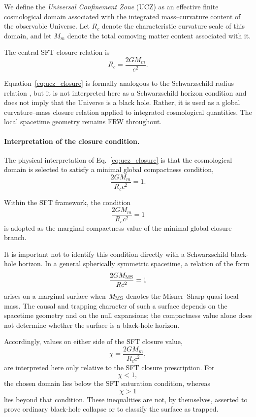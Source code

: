 \documentclass[12pt]{article}
\begin{document}
We define the \emph{Universal Confinement Zone} (UCZ) as an effective
finite cosmological domain associated with the integrated mass--curvature
content of the observable Universe. Let $R_c$ denote the characteristic
curvature scale of this domain, and let $M_m$ denote the total comoving
matter content associated with it.

The central SFT closure relation is
\begin{equation}
\boxed{
R_c=\frac{2GM_m}{c^2}.
}
\label{eq:ucz_closure}
\end{equation}

Equation~\eqref{eq:ucz_closure} is formally analogous to the
Schwarzschild radius relation
\cite{Schwarzschild1916,Carroll2001},
but it is not interpreted here as a Schwarzschild horizon condition and
does not imply that the Universe is a black hole.
Rather, it is used as a global curvature--mass closure relation applied
to integrated cosmological quantities.
The local spacetime geometry remains FRW throughout.

\paragraph{Interpretation of the closure condition.}

The physical interpretation of
Eq.~\eqref{eq:ucz_closure}
is that the cosmological domain is selected to satisfy a minimal global
compactness condition,
\begin{equation}
\frac{2GM_m}{R_c c^2}=1.
\end{equation}

Within the SFT framework, the condition
\[
\frac{2GM_m}{R_c c^2}=1
\]
is adopted as the marginal compactness value of the minimal global
closure branch.

It is important not to identify this condition directly with a
Schwarzschild black-hole horizon. In a general spherically symmetric
spacetime, a relation of the form
\[
\frac{2GM_{\rm MS}}{Rc^2}=1
\]
arises on a marginal surface when $M_{\rm MS}$ denotes the
Misner--Sharp quasi-local mass. The causal and trapping character of
such a surface depends on the spacetime geometry and on the null
expansions; the compactness value alone does not determine whether the
surface is a black-hole horizon.

Accordingly, values on either side of the SFT closure value,
\[
\chi
=
\frac{2GM_m}{R_c c^2},
\]
are interpreted here only relative to the SFT closure prescription.
For
\[
\chi<1,
\]
the chosen domain lies below the SFT saturation condition, whereas
\[
\chi>1
\]
lies beyond that condition. These inequalities are not, by
themselves, asserted to prove ordinary black-hole collapse or to
classify the surface as trapped.
\end{document}
